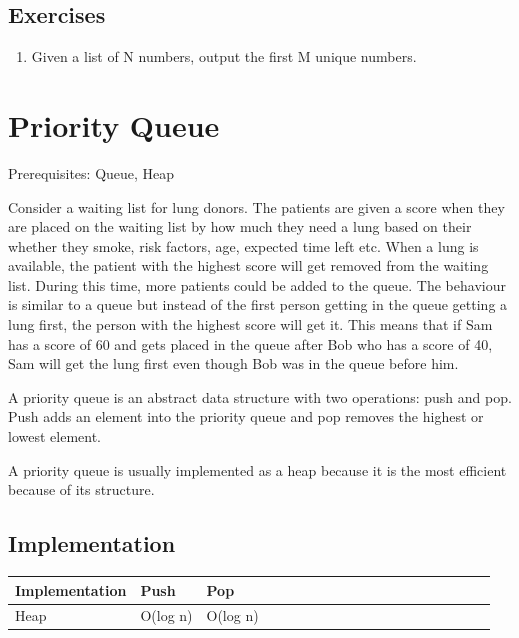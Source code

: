 \documentclass[11pt,oneside]{book}
\begin{document}
\subsection{Exercises}

\begin{enumerate}
\item Given a list of N numbers, output the first M unique numbers.
\end{enumerate}
\section{Priority Queue}

Prerequisites: Queue, Heap

Consider a waiting list for lung donors. The patients are given a score when they are placed on the waiting list by how much they need a lung based on their whether they smoke, risk factors, age, expected time left etc. When a lung is available, the patient with the highest score will get removed from the waiting list. During this time, more patients could be added to the queue. The behaviour is similar to a queue but instead of the first person getting in the queue getting a lung first, the person with the highest score will get it. This means that if Sam has a score of 60 and gets placed in the queue after Bob who has a score of 40, Sam will get the lung first even though Bob was in the queue before him.

A priority queue is an abstract data structure with two operations: push and pop. Push adds an element into the priority queue and pop removes the highest or lowest element.

A priority queue is usually implemented as a heap because it is the most efficient because of its structure.

\subsection{Implementation}

\vspace{10pt} \begin{tabular}{|l|l|l|l|l|l|l|l|l|l|l|l|l|l|l|l|l|l|l}\hline


  Implementation &
  Push &
  Pop\\
\hline


  Heap &
  O(log n) &
  O(log n)\\

\hline\end{tabular}
\end{document}
